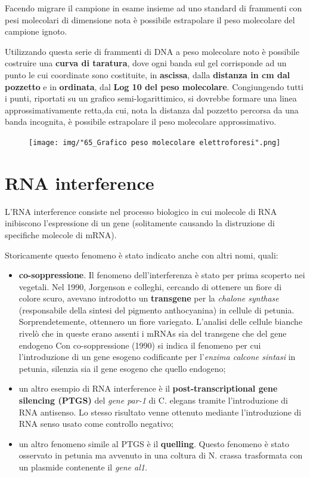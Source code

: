 \documentclass[11pt]{book}
\begin{document}
Facendo migrare il campione in esame insieme ad uno standard di
frammenti con pesi molecolari di dimensione nota è possibile estrapolare
il peso molecolare del campione ignoto.

Utilizzando questa serie di frammenti di DNA a peso molecolare noto è
possibile costruire una \textbf{curva di taratura}, dove ogni banda sul
gel corrisponde ad un punto le cui coordinate sono costituite, in
\textbf{ascissa}, dalla \textbf{distanza in cm dal pozzetto} e in
\textbf{ordinata}, dal \textbf{Log 10 del peso molecolare}. Congiungendo
tutti i punti, riportati su un grafico semi-logarittimico, si dovrebbe
formare una linea approssimativamente retta,da cui, nota la distanza dal
pozzetto percorsa da una banda incognita, è possibile estrapolare il
peso molecolare approssimativo.

\begin{figure}[htp]
\centering
\texttt{[image: img/"65\_Grafico peso molecolare elettroforesi".png]}
\caption{}
\label{grafico-peso-molecolare-elettroforesi}
\end{figure}

\section{RNA interference}\label{rna-interference}

L'RNA interference consiste nel processo biologico in cui molecole di
RNA inibiscono l'espressione di un gene (solitamente causando la
distruzione di specifiche molecole di mRNA).

Storicamente questo fenomeno è stato indicato anche con altri nomi,
quali:

\begin{itemize}
\itemsep1pt\parskip0pt
\item
  \textbf{co-soppressione}. Il fenomeno dell'interferenza è stato per
  prima scoperto nei vegetali. Nel 1990, Jorgenson e colleghi, cercando
  di ottenere un fiore di colore scuro, avevano introdotto un
  \textbf{transgene} per la \emph{chalone synthase} (responsabile della
  sintesi del pigmento anthocyanina) in cellule di petunia.
  Sorprendetemente, ottennero un fiore variegato. L'analisi delle
  cellule bianche rivelò che in queste erano assenti i mRNAs sia del
  transgene che del gene endogeno Con co-soppressione (1990) si indica
  il fenomeno per cui l'introduzione di un gene esogeno codificante per
  l'\emph{enzima calcone sintasi} in petunia, silenzia sia il gene
  esogeno che quello endogeno;
\item
  un altro esempio di RNA interference è il \textbf{post-transcriptional
  gene silencing (PTGS)} del \emph{gene par-1} di C. elegans tramite
  l'introduzione di RNA antisenso. Lo stesso risultato venne ottenuto
  mediante l'introduzione di RNA senso usato come controllo negativo;
\item
  un altro fenomeno simile al PTGS è il \textbf{quelling}. Questo
  fenomeno è stato osservato in petunia ma avvenuto in una coltura di N.
  crassa trasformata con un plasmide contenente il \emph{gene al1}.
\end{itemize}
\end{document}
